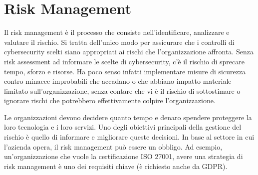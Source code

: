 \chapter{Risk Management}

Il risk management è il processo che consiste nell'identificare, analizzare e valutare il rischio. Si tratta dell'unico modo per assicurare che i controlli di cybersecurity scelti siano appropriati ai rischi che l'organizzazione affronta. Senza risk assessment ad informare le scelte di cybersecurity, c'è il rischio di sprecare tempo, sforzo e risorse. Ha poco senso infatti implementare misure di sicurezza contro minacce improbabili che accadano o che abbiano impatto materiale limitato sull'organizzazione, senza contare che vi è il rischio di sottostimare o ignorare rischi che potrebbero effettivamente colpire l'organizzazione. 

Le organizzazioni devono decidere quanto tempo e denaro spendere proteggere la loro tecnologia e i loro servizi. Uno degli obiettivi principali della gestione del rischio è quello di informare e migliorare queste decisioni. In base al settore in cui l'azienda opera, il risk management può essere un obbligo. Ad esempio, un'organizzazione che vuole la certificazione ISO 27001, avere una strategia di risk management è uno dei requisiti chiave (è richiesto anche da GDPR).
\\

